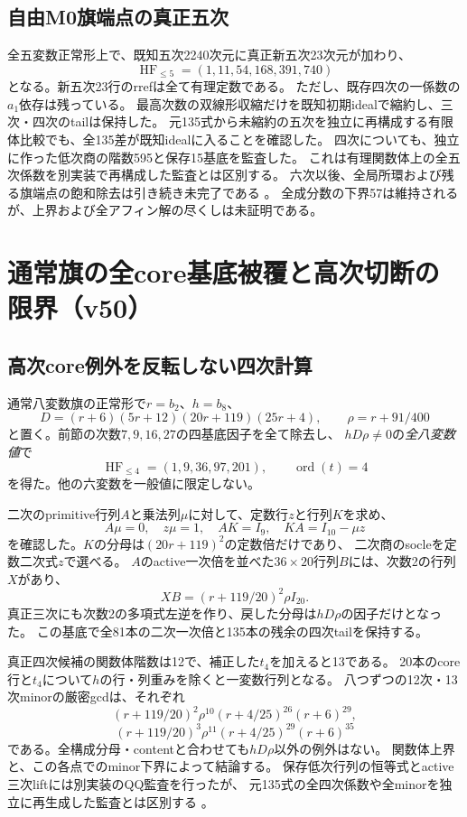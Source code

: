 \documentclass[11pt,a4paper]{ltjsarticle}
\theoremstyle{remark}
\begin{document}
\subsection{自由M0旗端点の真正五次}
全五変数正常形上で、既知五次2240次元に真正新五次23次元が加わり、
\[
 \operatorname{HF}_{\le5}=(1,11,54,168,391,740)
\]
となる。新五次23行のrrefは全て有理定数である。
ただし、既存四次の一係数の$a_1$依存は残っている。
最高次数の双線形収縮だけを既知初期idealで縮約し、三次・四次のtailは保持した。
元135式から未縮約の五次を独立に再構成する有限体比較でも、全135差が既知idealに入ることを確認した。
四次についても、独立に作った低次商の階数595と保存15基底を監査した。
これは有理関数体上の全五次係数を別実装で再構成した監査とは区別する。
六次以後、全局所環および残る旗端点の飽和除去は引き続き未完了である
\cite{free-five-v49,free-four-review-v49}。
全成分数の下界57は維持されるが、上界および全アフィン解の尽くしは未証明である。

\section{通常旗の全core基底被覆と高次切断の限界（v50）}
\label{sec:v50}
\subsection{高次core例外を反転しない四次計算}
通常八変数旗の正常形で$r=b_2$、$h=b_8$、
\[
 D=(r+6)(5r+12)(20r+119)(25r+4),\qquad \rho=r+91/400
\]
と置く。前節の次数$7,9,16,27$の四基底因子を全て除去し、
$hD\rho\ne0$の\emph{全八変数値}で
\[
 \operatorname{HF}_{\le4}=(1,9,36,97,201),\qquad
 \operatorname{ord}(t)=4
\]
を得た。他の六変数を一般値に限定しない。

二次のprimitive行列$A$と乗法列$\mu$に対して、定数行$z$と行列$K$を求め、
\[
 A\mu=0,\quad z\mu=1,\quad AK=I_9,\quad KA=I_{10}-\mu z
\]
を確認した。$K$の分母は$(20r+119)^2$の定数倍だけであり、
二次商のsocleを定数二次式$z$で選べる。
$A$のactive一次倍を並べた$36\times20$行列$B$には、次数2の行列$X$があり、
\[
 XB=(r+119/20)^2\rho I_{20}.
\]
真正三次にも次数2の多項式左逆を作り、戻した分母は$hD\rho$の因子だけとなった。
この基底で全81本の二次一次倍と135本の残余の四次tailを保持する。

真正四次候補の関数体階数は12で、補正した$t_4$を加えると13である。
20本のcore行と$t_4$について$h$の行・列重みを除くと一変数行列となる。
八つずつの12次・13次minorの厳密gcdは、それぞれ
\[
 (r+119/20)^2\rho^{10}(r+4/25)^{26}(r+6)^{29},
\]
\[
 (r+119/20)^3\rho^{11}(r+4/25)^{29}(r+6)^{35}
\]
である。全構成分母・contentと合わせても$hD\rho$以外の例外はない。
関数体上界と、この各点でのminor下界によって結論する。
保存低次行列の恒等式とactive三次liftには別実装のQQ監査を行ったが、
元135式の全四次係数や全minorを独立に再生成した監査とは区別する
\cite{flag-global-cover-v50}。
\end{document}
